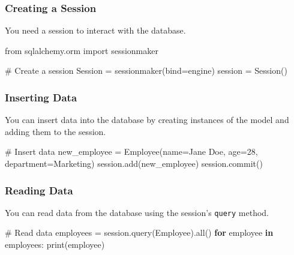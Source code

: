 \documentclass[
  letterpaper,
  DIV=11,
  numbers=noendperiod]{scrreprt}
\newenvironment{Shaded}{\begin{snugshade}}{\end{snugshade}}
\newcommand{\BuiltInTok}[1]{\textcolor[rgb]{0.00,0.23,0.31}{#1}}
\newcommand{\CommentTok}[1]{\textcolor[rgb]{0.37,0.37,0.37}{#1}}
\newcommand{\ControlFlowTok}[1]{\textcolor[rgb]{0.00,0.23,0.31}{\textbf{#1}}}
\newcommand{\DecValTok}[1]{\textcolor[rgb]{0.68,0.00,0.00}{#1}}
\newcommand{\ImportTok}[1]{\textcolor[rgb]{0.00,0.46,0.62}{#1}}
\newcommand{\KeywordTok}[1]{\textcolor[rgb]{0.00,0.23,0.31}{\textbf{#1}}}
\newcommand{\NormalTok}[1]{\textcolor[rgb]{0.00,0.23,0.31}{#1}}
\newcommand{\OperatorTok}[1]{\textcolor[rgb]{0.37,0.37,0.37}{#1}}
\newcommand{\StringTok}[1]{\textcolor[rgb]{0.13,0.47,0.30}{#1}}
\begin{document}
\subsubsection{Creating a Session}\label{creating-a-session}

You need a session to interact with the database.

\begin{Shaded}
\begin{Highlighting}[]
\ImportTok{from}\NormalTok{ sqlalchemy.orm }\ImportTok{import}\NormalTok{ sessionmaker}

\CommentTok{\# Create a session}
\NormalTok{Session }\OperatorTok{=}\NormalTok{ sessionmaker(bind}\OperatorTok{=}\NormalTok{engine)}
\NormalTok{session }\OperatorTok{=}\NormalTok{ Session()}
\end{Highlighting}
\end{Shaded}

\subsubsection{Inserting Data}\label{inserting-data-1}

You can insert data into the database by creating instances of the model
and adding them to the session.

\begin{Shaded}
\begin{Highlighting}[]
\CommentTok{\# Insert data}
\NormalTok{new\_employee }\OperatorTok{=}\NormalTok{ Employee(name}\OperatorTok{=}\StringTok{\textquotesingle{}Jane Doe\textquotesingle{}}\NormalTok{, age}\OperatorTok{=}\DecValTok{28}\NormalTok{, department}\OperatorTok{=}\StringTok{\textquotesingle{}Marketing\textquotesingle{}}\NormalTok{)}
\NormalTok{session.add(new\_employee)}
\NormalTok{session.commit()}
\end{Highlighting}
\end{Shaded}

\subsubsection{Reading Data}\label{reading-data-1}

You can read data from the database using the session's \texttt{query}
method.

\begin{Shaded}
\begin{Highlighting}[]
\CommentTok{\# Read data}
\NormalTok{employees }\OperatorTok{=}\NormalTok{ session.query(Employee).}\BuiltInTok{all}\NormalTok{()}
\ControlFlowTok{for}\NormalTok{ employee }\KeywordTok{in}\NormalTok{ employees:}
    \BuiltInTok{print}\NormalTok{(employee)}
\end{Highlighting}
\end{Shaded}
\end{document}
